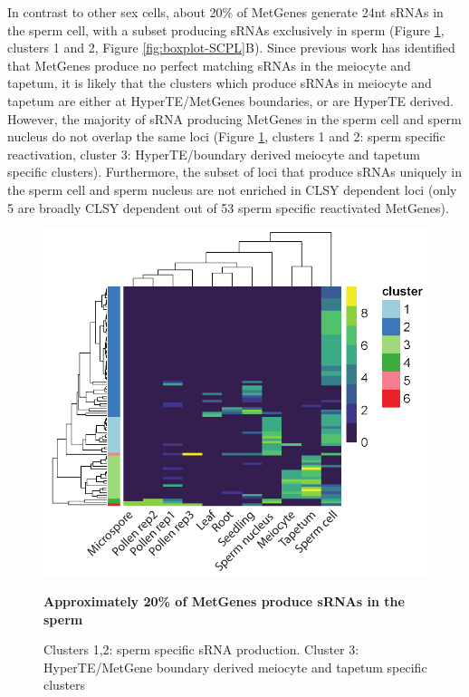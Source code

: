 In contrast to other sex cells, about 20\% of MetGenes generate 24nt sRNAs in the sperm cell, with a subset producing sRNAs exclusively in sperm (Figure \ref{fig:hm_metgene_reactivated}, clusters 1 and 2, Figure \ref{fig:boxplot-SCPL}B). Since previous work has identified that MetGenes produce no perfect matching sRNAs in the meiocyte and tapetum\citep{RN187}, it is likely that the clusters which produce sRNAs in meiocyte and tapetum are either at HyperTE/MetGenes boundaries, or are HyperTE derived. However, the majority of sRNA producing MetGenes in the sperm cell and sperm nucleus do not overlap the same loci (Figure \ref{fig:hm_metgene_reactivated}, clusters 1 and 2: sperm specific reactivation, cluster 3: HyperTE/boundary derived meiocyte and tapetum specific clusters). Furthermore, the subset of loci that produce sRNAs uniquely in the sperm cell and sperm nucleus are not enriched in CLSY dependent loci (only 5 are broadly CLSY dependent out of 53 sperm specific reactivated MetGenes).

\begin{figure}[htbp!] 
\centering
    \includegraphics[width=1\textwidth]{Chapter2/Figs/Figure11_Reactivated_MetGenes_heatmap.pdf}
\caption{\textbf{Approximately 20\% of MetGenes produce sRNAs in the sperm}}
\label{fig:hm_metgene_reactivated}
\captionsetup{font=small}
    \caption*{Clusters 1,2: sperm specific sRNA production. Cluster 3: HyperTE/MetGene boundary derived meiocyte and tapetum specific clusters}
\end{figure}

